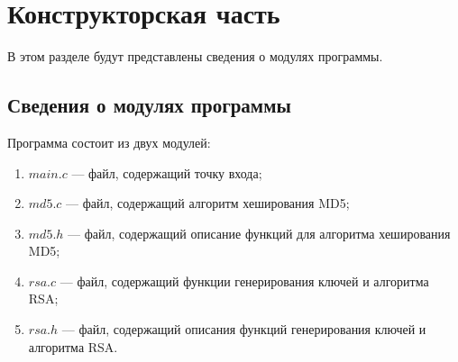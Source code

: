 \chapter{Конструкторская часть}
В этом разделе будут представлены сведения о модулях программы.

\section{Сведения о модулях программы}

Программа состоит из двух модулей:
\begin{enumerate}[label=\arabic*)]
    \item $main.c$ --- файл, содержащий точку входа;
    \item $md5.c$ --- файл, содержащий алгоритм хеширования MD5;
    \item $md5.h$ --- файл, содержащий описание функций для алгоритма хеширования MD5;
    \item $rsa.c$ --- файл, содержащий функции генерирования ключей и алгоритма RSA;
    \item $rsa.h$ --- файл, содержащий описания функций генерирования ключей и алгоритма RSA.
\end{enumerate}
